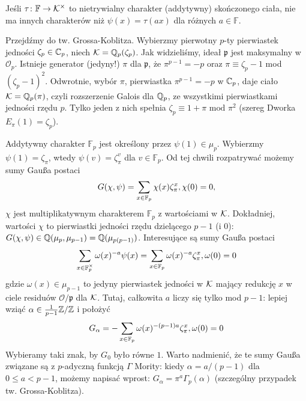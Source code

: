 \begin{fakt}
	Jeśli $\tau \colon \mathbb F \to \mathcal K^\times$ to nietrywialny charakter (addytywny) skończonego ciała, nie ma innych charakterów niż $\psi(x) = \tau(ax)$ dla różnych $a \in \mathbb F$.
\end{fakt}

Przejdźmy  do tw. Grossa-Koblitza.
Wybierzmy pierwotny $p$-ty pierwiastek jedności $\zeta_p \in \mathbb C_p$, niech $\mathcal K = \mathbb Q_p(\zeta_p)$.
Jak widzieliśmy, ideał $\mathfrak p$ jest maksymalny w $\mathcal O_p$.
Istnieje generator (jedyny!) $\pi$ dla $\mathfrak p$, że $\pi^{p-1} = -p$ oraz $\pi \equiv \zeta_p - 1$ mod $(\zeta_p-1)^2$.
Odwrotnie, wybór $\pi$, pierwiastka $\pi^{p-1} = -p$ w $\mathbb C_p$, daje ciało $\mathcal K = \mathbb Q_p(\pi)$, czyli rozszerzenie Galois dla $\mathbb Q_p$, ze wszystkimi pierwiastkami jedności rzędu $p$.
Tylko jeden z nich spełnia $\zeta_p \equiv 1 + \pi \mbox{ mod } \pi^2$ (szereg Dworka $E_\pi(1) = \zeta_p$).

Addytywny charakter $\mathbb F_p$ jest określony przez $\psi(1) \in \mu_p$.
Wybierzmy $\psi(1) = \zeta_{\pi}$, wtedy $\psi(v) = \zeta_\pi^v$ dla $v \in \mathbb F_p$.
Od tej chwili rozpatrywać możemy sumy Gaußa postaci
\[
	G(\chi, \psi) = \sum_{x \in \mathbb F_p} \chi(x) \zeta_\pi^x, \hfill \chi(0) = 0,
\]
$\chi$ jest multiplikatywnym charakterem $\mathbb F_p$ z wartościami w $\mathcal K$.
Dokładniej, wartości $\chi$ to pierwiastki jedności rzędu dzielącego $p-1$ (i $0$): $G(\chi, \psi) \in \mathbb Q(\mu_p, \mu_{p-1}) = \mathbb Q(\mu_{p(p-1)})$.
Interesujące są sumy Gaußa postaci
\[
	\sum_{x \in \mathbb F_p^\times} \omega(x)^{-a} \psi(x) = \sum_{x \in \mathbb F_p} \omega(x)^{-a} \zeta_\pi^x, \hfill \omega(0) = 0
\]
gdzie $\omega(x) \in \mu_{p-1}$ to jedyny pierwiastek jedności w $\mathcal K$ mający redukcję $x$ w ciele residuów $\mathcal O/\mathfrak p$ dla $\mathcal K$.
Tutaj, całkowita $a$ liczy się tylko mod $p-1$: lepiej wziąć $\alpha \in \frac{1}{p-1} \mathbb Z/\mathbb Z$ i położyć
\[
	G_\alpha = - \sum_{x \in \mathbb F_p} \omega(x) ^{-(p-1)a} \zeta_\pi^x, \hfill \omega(0) = 0
\]
Wybieramy taki znak, by $G_0$ było równe $1$.
Warto nadmienić, że te sumy Gaußa związane są z $p$-adyczną funkcją $\Gamma$ Mority: kiedy $\alpha = a/(p-1)$ dla $0 \le a < p-1$, możemy napisać wprost: $G_\alpha = \pi^a \Gamma_p (\alpha)$ (szczególny przypadek tw. Grossa-Koblitza).

